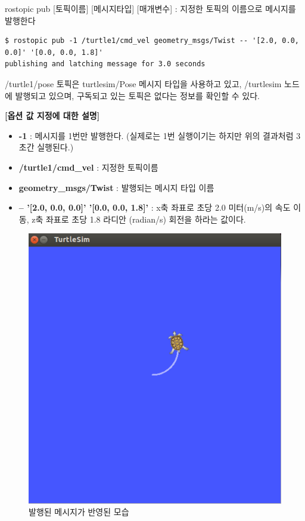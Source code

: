\vspace{\baselineskip}
\noindent
{}\circled{\thenum} rostopic pub [토픽이름] [메시지타입] [매개변수] : 지정한 토픽의 이름으로 메시지를 발행한다

\begin{lstlisting}[language=ROS]
$ rostopic pub -1 /turtle1/cmd_vel geometry_msgs/Twist -- '[2.0, 0.0, 0.0]' '[0.0, 0.0, 1.8]'
publishing and latching message for 3.0 seconds
\end{lstlisting}

\noindent
/turtle1/pose 토픽은 turtlesim/Pose 메시지 타입을 사용하고 있고, /turtlesim 노드에 발행되고 있으며, 구독되고 있는 토픽은 없다는 정보를 확인할 수 있다. 

\vspace{\baselineskip}
\noindent
\textbf{[옵션 값 지정에 대한 설명]}
\begin{itemize}[leftmargin=*]
\item \textbf{-1} : 메시지를 1번만 발행한다. (실제로는 1번 실행이기는 하지만 위의 결과처럼 3초간 실행된다.)
\item \textbf{/turtle1/cmd\_vel} : 지정한 토픽이름
\item \textbf{geometry\_msgs/Twist} : 발행되는 메시지 타입 이름
\item \textbf{-- '[2.0, 0.0, 0.0]' '[0.0, 0.0, 1.8]'} : x축 좌표로 초당 2.0 미터(m/s)의 속도 이동, z축 좌표로 초당 1.8 라디안 (radian/s) 회전을 하라는 값이다.
\end{itemize}

\begin{figure}[h]
\centering\includegraphics[width=0.7\columnwidth]{pictures/chapter5/rostopic_pub.png}
\caption{발행된 메시지가 반영된 모습}
\end{figure}

